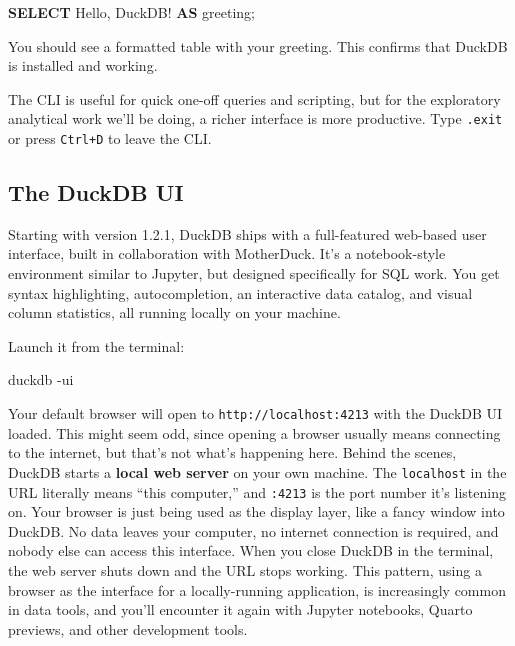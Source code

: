 \documentclass[
  letterpaper,
  DIV=11,
  numbers=noendperiod]{scrreprt}
\newenvironment{Shaded}{\begin{snugshade}}{\end{snugshade}}
\newcommand{\AttributeTok}[1]{\textcolor[rgb]{0.40,0.45,0.13}{#1}}
\newcommand{\ExtensionTok}[1]{\textcolor[rgb]{0.00,0.23,0.31}{#1}}
\newcommand{\KeywordTok}[1]{\textcolor[rgb]{0.00,0.23,0.31}{\textbf{#1}}}
\newcommand{\NormalTok}[1]{\textcolor[rgb]{0.00,0.23,0.31}{#1}}
\newcommand{\StringTok}[1]{\textcolor[rgb]{0.13,0.47,0.30}{#1}}
\begin{document}
\begin{codelisting}

\caption{\texttt{duckdb}}

\begin{Shaded}
\begin{Highlighting}[]
\KeywordTok{SELECT} \StringTok{\textquotesingle{}Hello, DuckDB!\textquotesingle{}} \KeywordTok{AS}\NormalTok{ greeting;}
\end{Highlighting}
\end{Shaded}

\end{codelisting}

You should see a formatted table with your greeting. This confirms that
DuckDB is installed and working.

The CLI is useful for quick one-off queries and scripting, but for the
exploratory analytical work we'll be doing, a richer interface is more
productive. Type \texttt{.exit} or press \texttt{Ctrl+D} to leave the
CLI.

\subsection{The DuckDB UI}\label{the-duckdb-ui}

Starting with version 1.2.1, DuckDB ships with a full-featured web-based
user interface, built in collaboration with MotherDuck. It's a
notebook-style environment similar to Jupyter, but designed specifically
for SQL work. You get syntax highlighting, autocompletion, an
interactive data catalog, and visual column statistics, all running
locally on your machine.

Launch it from the terminal:

\begin{codelisting}

\caption{\texttt{terminal}}

\begin{Shaded}
\begin{Highlighting}[]
\ExtensionTok{duckdb} \AttributeTok{{-}ui}
\end{Highlighting}
\end{Shaded}

\end{codelisting}

Your default browser will open to \texttt{http://localhost:4213} with
the DuckDB UI loaded. This might seem odd, since opening a browser
usually means connecting to the internet, but that's not what's
happening here. Behind the scenes, DuckDB starts a \textbf{local web
server} on your own machine. The \texttt{localhost} in the URL literally
means ``this computer,'' and \texttt{:4213} is the port number it's
listening on. Your browser is just being used as the display layer, like
a fancy window into DuckDB. No data leaves your computer, no internet
connection is required, and nobody else can access this interface. When
you close DuckDB in the terminal, the web server shuts down and the URL
stops working. This pattern, using a browser as the interface for a
locally-running application, is increasingly common in data tools, and
you'll encounter it again with Jupyter notebooks, Quarto previews, and
other development tools.
\end{document}
